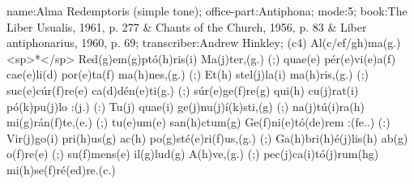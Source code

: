 name:Alma Redemptoris (simple tone);
office-part:Antiphona;
mode:5;
book:The Liber Usualis, 1961, p. 277 & Chants of the Church, 1956, p. 83 & Liber antiphonarius, 1960, p. 69;
transcriber:Andrew Hinkley;
(c4) Al(c/ef/gh)ma(g.) <sp>*</sp> Red(g)em(g)ptó(h)ris(i) Ma(j)ter,(g.) (;) quae(e) pér(e)vi(e)a(f) cae(e)li(d) por(e)ta(f) ma(h)nes,(g.) (;) Et(h) stel(j)la(i) ma(h)ris,(g.) (;) suc(e)cúr(f)re(e) ca(d)dén(e)ti(g.) (;) súr(e)ge(f)re(g) qui(h) cu(j)rat(i) pó(k)pu(j)lo :(j.) (:) Tu(j) quae(i) ge(j)nu(j)í(k)sti,(g) (;) na(j)tú(i)ra(h) mi(g)rán(f)te,(e.) (;) tu(e)um(e) san(h)ctum(g) Ge(f)ni(e)tó(de)rem :(fe..) (:) Vir(j)go(i) pri(h)us(g) ac(h) po(g)sté(e)ri(f)us,(g.) (;) Ga(h)bri(h)é(j)lis(h) ab(g) o(f)re(e) (;) su(f)mens(e) il(g)lud(g) A(h)ve,(g.) (;) pec(j)ca(i)tó(j)rum(hg) mi(h)se(f)ré(ed)re.(c.)
